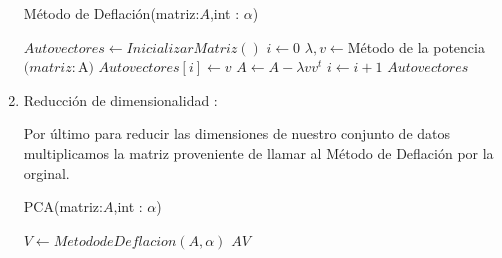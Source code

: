 \begin{enumerate}
\begin{algorithm}[H]
\caption{Método de Deflación(matriz:$A$,int : $\alpha$)}
\begin{algorithmic}[H]
    \State $Autovectores \leftarrow InicializarMatriz()$
    \State $i \leftarrow 0$
        \State $\lambda,v \leftarrow $Método de la potencia$(matriz:$A$)$
        \State $Autovectores[i] \leftarrow v$
        \State $A \leftarrow A - \lambda vv^t$
        \State $i \leftarrow i +1$
    \EndWhile  
    \State
    \Return  $Autovectores$
\end{algorithmic}
\end{algorithm}

\item Reducción de dimensionalidad :

Por último para reducir las dimensiones de nuestro conjunto de datos multiplicamos la matriz proveniente de llamar al Método de Deflación por la orginal.
\begin{algorithm}[H]
\caption{PCA(matriz:$A$,int : $\alpha$)}
\begin{algorithmic}[H]
    \State $V  \leftarrow Metodo de Deflacion(A,\alpha)$
    \State
    \Return  $A V$
\end{algorithmic}
\end{algorithm}

\end{enumerate}





